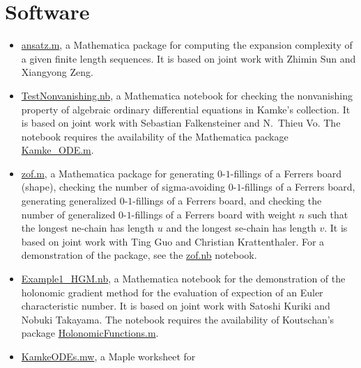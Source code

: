 \documentclass[a4paper,12pt]{article}
\begin{document}


\section*{\Large{Software}}
\begin{itemize}
\item \href{https://yzhang1616.github.io/complexity/ansatz.m}{ansatz.m}, 
a Mathematica package for computing the expansion complexity of a given finite length sequences. 
It is based on joint work with Zhimin Sun and Xiangyong Zeng. 
  \item \href{https://yzhang1616.github.io/TestNonvanishing.nb}{TestNonvanishing.nb}, 
    a Mathematica notebook for checking the nonvanishing property of algebraic ordinary
    differential equations in Kamke's collection. It is based on joint work
    with Sebastian Falkensteiner and N.\ Thieu Vo. 
    The notebook requires the availability of the Mathematica package \href{https://yzhang1616.github.io/Kamke_ODE.m}{Kamke\_ODE.m}.
  \item \href{https://yzhang1616.github.io/zof/zof.m}{zof.m}, a Mathematica package for generating $0$-$1$-fillings 
  of a Ferrers board (shape), checking the number of
    sigma-avoiding $0$-$1$-fillings of a Ferrers board, 
     generating generalized $0$-$1$-fillings of a Ferrers board, 
     and checking the number of generalized $0$-$1$-fillings of a Ferrers board with weight $n$
    such that the longest ne-chain has length $u$ 
    and the longest se-chain has length $v$. It is based on joint work with Ting
    Guo and Christian Krattenthaler. For a demonstration of the package,
    see the \href{https://yzhang1616.github.io/zof/zof.nb}{zof.nb} notebook. 
  \item \href{https://yzhang1616.github.io/ec1/Example1_HGM.nb}{Example1\_HGM.nb}, a Mathematica notebook for
    the demonstration of the holonomic gradient method for the evaluation of
    expection of an Euler characteristic number. It is based on joint work
    with Satoshi Kuriki and Nobuki Takayama. 
    The notebook requires the availability of Koutschan's package 
     \href{http://www.risc.jku.at/research/combinat/software/ergosum/RISC/HolonomicFunctions.html}{HolonomicFunctions.m}.
  \item \href{https://yzhang1616.github.io/KamkeODEs.mw}{KamkeODEs.mw}, a Maple worksheet for 

\end{itemize}
\end{document}
